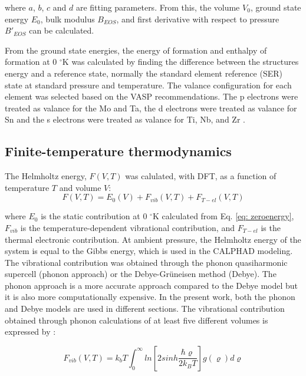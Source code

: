 \noindent where $a$, $b$, $c$ and $d$ are fitting parameters. From this, the volume $V_0$, ground state energy $E_{0}$, bulk modulus $B_{EOS}$, and first derivative with respect to pressure $B'_{EOS}$ can be calculated. 

From the ground state energies, the energy of formation and enthalpy of formation at 0 $^\circ$K was calculated by finding the difference between the structures energy and a reference state, normally the standard element reference (SER) state at standard pressure and temperature. The valance configuration for each element was selected based on the VASP recommendations. The p electrons were treated as valance for the Mo and Ta, the d electrons were treated as valance for Sn and the s electrons were treated as valance for Ti, Nb, and Zr \cite{Kresse1996,Kresse1999}.

\subsection{Finite-temperature thermodynamics}

The Helmholtz energy, $F(V,T)$ was calulated, with DFT, as a function of temperature $T$ and volume $V$:
 \begin{equation}
 \label{eq: helmholtz}
 F(V,T) = E_{0}(V) + F_{vib}(V,T) + F_{T-el}(V,T)
 \end{equation}
 
\noindent where $E_0$ is the static contribution at 0 $^\circ$K calculated from Eq. \ref{eq: zeroenergy}, $F_{vib}$ is the temperature-dependent vibrational contribution, and $F_{T-el}$ is the thermal electronic contribution. At ambient pressure, the Helmholtz energy of the system is equal to the Gibbs energy, which is used in the CALPHAD modeling. The vibrational contribution was obtained through the phonon quasiharmonic supercell (phonon approach) or the Debye-Gr\"uneisen method (Debye). The phonon approach is a more accurate approach compared to the Debye model but it is also more computationally expensive. In the present work, both the phonon and Debye models are used in different sections. The vibrational contribution obtained through phonon calculations of at least five different volumes is expressed by \cite{Wang2012}:

\begin{equation}
\label{eq: phonon}
F_{vib}(V,T) = k_{b}T \int_{0}^{\infty} ln \left[ 2sinh \frac{\hbar \varrho}{2k_BT} \right] g(\varrho) d\varrho
\end{equation}

